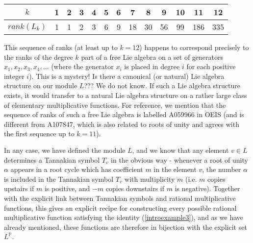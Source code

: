 \documentclass[a4paper]{article}
\begin{document}
\begin{example}
\begin{enumerate}
\vspace{6pt}
\begin{tabular}{  | c || c | c | c | c | c | c | c | c | c | c | c | c |   }
  \hline			
  $k$ & 1 & 2 & 3 & 4 & 5 & 6 & 7 & 8 & 9 & 10 & 11 & 12   \\
  \hline
  $rank(L_k) $ & 1 & 1 & 2 & 3 & 6 & 9 & 18 & 30 & 56 & 99 & 186 & 335    \\
  \hline  
\end{tabular}
\vspace{6pt}

This sequence of ranks (at least up to $k=12$) happens to correspond precisely to the ranks of the degree $k$ part of a free Lie algebra on a set of generators $x_1, x_2, x_3, x_4, \ldots$ (where the generator $x_i$ is placed in degree $i$ for each positive integer $i$). This is a mystery! Is there a canonical (or natural) Lie algebra structure on our module $L$??? We do not know. If such a Lie algebra structure exists, it would transfer to a natural Lie algebra structure on a rather large class of elementary multiplicative functions. For reference, we mention that the sequence of ranks of such a free Lie algebra is labelled A059966 in OEIS (and is different from A107847, which is also related to roots of unity and agrees with the first sequence up to $k=11$). 

In any case, we have defined the module $L$, and we know that any element $v \in L$ determines a Tannakian symbol $T_v$ in the obvious way - whenever a root of unity $\alpha$ appears in a root cycle which has coefficient $m$ in the element $v$, the number $\alpha$ is included in the Tannakian symbol $T_v$ with multiplicity $m$ (i.e. $m$ copies upstairs if $m$ is positive, and $-m$ copies downstairs if $m$ is negative). Together with the explicit link between Tannakian symbols and rational multiplicative functions, this gives an explicit recipe for constructing every possible rational multiplicative function satisfying the identity (\ref{introexample3}), and as we have already mentioned, these functions are therefore in bijection with the explicit set $L^{\mathbb{P}}$.


\end{enumerate}
\end{example}
\end{document}

